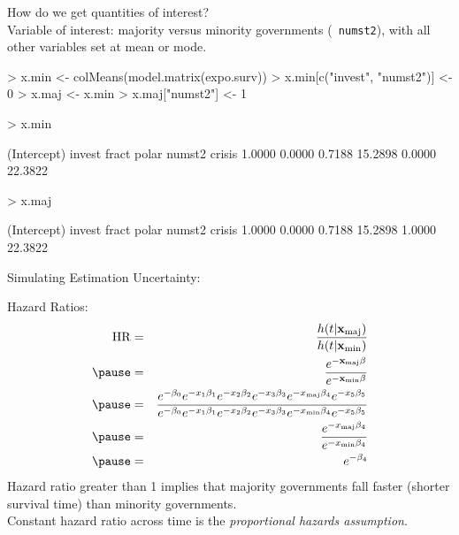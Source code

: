 \documentclass[handout]{beamer}
\begin{document}
\begin{frame}[fragile]
How do we get quantities of interest?\\
\pause
\bigskip
Variable of interest: majority versus minority governments ({\tt
numst2}), with all other variables set at mean or mode.\\
\pause
\tiny{
\bigskip
\begin{Schunk}
\begin{Sinput}
> x.min <- colMeans(model.matrix(expo.surv))
> x.min[c("invest", "numst2")] <- 0
> x.maj <- x.min
> x.maj["numst2"] <- 1
\end{Sinput}
\end{Schunk}
\pause
\begin{Schunk}
\begin{Sinput}
> x.min
\end{Sinput}
\begin{Soutput}
(Intercept)      invest       fract       polar      numst2      crisis 
     1.0000      0.0000      0.7188     15.2898      0.0000     22.3822 
\end{Soutput}
\begin{Sinput}
> x.maj
\end{Sinput}
\begin{Soutput}
(Intercept)      invest       fract       polar      numst2      crisis 
     1.0000      0.0000      0.7188     15.2898      1.0000     22.3822 
\end{Soutput}
\end{Schunk}
\bigskip
\normalsize
Simulating Estimation Uncertainty:
\pause
\tiny{
\begin{Schunk}
\end{Schunk}
}
}
\end{frame}

\begin{frame}[fragile]

\pause
\bigskip
\normalsize
Hazard Ratios:
\begin{eqnarray*}
\mathrm{HR} &=& \frac{h(t | \mathbf{x}_{\mathrm{maj}})}{h(t | \mathbf{x}_{\mathrm{min}})}\\
\pause
&=& \frac{e^{-\mathbf{x}_{\mathrm{maj}}\beta }}{e^{-\mathbf{x}_{\mathrm{min}}\beta }}\\
\pause
&=& \frac{e^{-\beta_0}e^{-x_1 \beta_1}e^{-x_2 \beta_2} e^{-x_3
\beta_3} e^{-x_{\mathrm{maj}} \beta_4} e^{-x_5 \beta_5}}{e^{-\beta_0}e^{-x_1 \beta_1}e^{-x_2 \beta_2} e^{-x_3
\beta_3} e^{-x_{\mathrm{min}} \beta_4} e^{-x_5 \beta_5}}\\
\pause
&=& \frac{e^{-x_{\mathrm{maj}} \beta_4}}{e^{-x_{\mathrm{min}} \beta_4}}\\
\pause
&=& e^{-\beta_4}
\end{eqnarray*}
\pause
Hazard ratio greater than 1 implies that majority governments fall
faster (shorter survival time) than minority governments.  \\
\pause 
\bigskip
Constant hazard ratio across time is the \emph{proportional hazards assumption}.
\end{frame}
\end{document}
